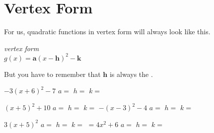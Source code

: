 \section{Vertex Form}

For us, quadratic functions in vertex form will always look 
like this.
\begin{tcolorbox}[center,width=4in,colback=white]
    \centering
    {\itshape vertex form}\\[0.5\baselineskip]
    \Large
    $g(x) = \bm{a}(x-\bm{h})^2 - \bm{k}$
\end{tcolorbox}

But you have to remember that $\bm{h}$ is always the 
    .

{
    $-3(x+6)^2 -7$
    \tcblower 
    $a = $
    \hfill 
    $h = $
    \hfill 
    $k = $
}


\myProblemsWithContent
{
    $(x+5)^2 +10$
    \tcblower 
    $a = $
    \hfill 
    $h = $
    \hfill 
    $k = $
}
{
    $-(x-3)^2 - 4 $
    \tcblower 
    $a = $
    \hfill 
    $h = $
    \hfill 
    $k = $
}

\myProblemsWithContent
{
    $3(x+5)^2 $
    \tcblower 
    $a = $
    \hfill 
    $h = $
    \hfill 
    $k = $
}
{
    $=4x^2 + 6 $
    \tcblower 
    $a = $
    \hfill 
    $h = $
    \hfill 
    $k = $
}
